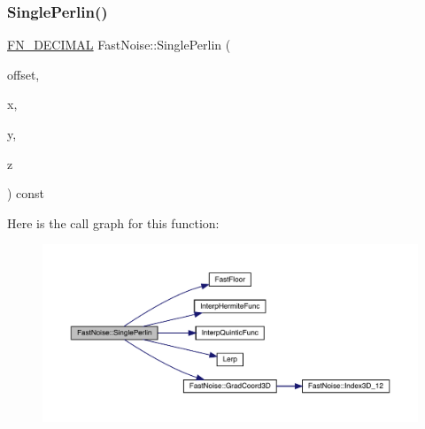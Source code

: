 \subsubsection{\texorpdfstring{Single\+Perlin()}{SinglePerlin()}\hspace{0.1cm}{\footnotesize\ttfamily [2/2]}}
{\footnotesize\ttfamily \mbox{\hyperlink{_fast_noise_8h_a75a9ef6d2541c4921815b885bfd449c3}{F\+N\+\_\+\+D\+E\+C\+I\+M\+AL}} Fast\+Noise\+::\+Single\+Perlin (\begin{DoxyParamCaption}\item[{unsigned char}]{offset,  }\item[{\mbox{\hyperlink{_fast_noise_8h_a75a9ef6d2541c4921815b885bfd449c3}{F\+N\+\_\+\+D\+E\+C\+I\+M\+AL}}}]{x,  }\item[{\mbox{\hyperlink{_fast_noise_8h_a75a9ef6d2541c4921815b885bfd449c3}{F\+N\+\_\+\+D\+E\+C\+I\+M\+AL}}}]{y,  }\item[{\mbox{\hyperlink{_fast_noise_8h_a75a9ef6d2541c4921815b885bfd449c3}{F\+N\+\_\+\+D\+E\+C\+I\+M\+AL}}}]{z }\end{DoxyParamCaption}) const\hspace{0.3cm}{\ttfamily [private]}}

Here is the call graph for this function\+:
\nopagebreak
\begin{figure}[H]
\begin{center}
\leavevmode
\includegraphics[width=350pt]{class_fast_noise_a93f68e6b4d364be7359076d5c7f19313_cgraph}
\end{center}
\end{figure}
\mbox{\label{class_fast_noise_a7de7c8fe23437c93cc139193e48f3079}} 
